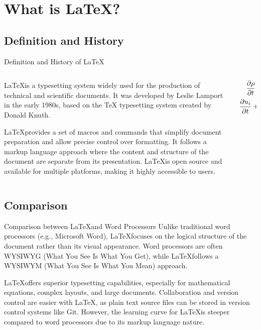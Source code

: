 \documentclass[aspectratio=169]{SUSTechBeamer}
\begin{document}
\section{What is \LaTeX?}

\subsection{Definition and History}
\begin{frame}{Definition and History of \LaTeX}
    \begin{columns}
        \begin{column}{0.6\textwidth}
  \LaTeX is a typesetting system widely used for the production of technical and scientific documents. It was developed by Leslie Lamport in the early 1980s, based on the TeX typesetting system created by Donald Knuth.

  \LaTeX provides a set of macros and commands that simplify document preparation and allow precise control over formatting. It follows a markup language approach where the content and structure of the document are separate from its presentation. \LaTeX is open source and available for multiple platforms, making it highly accessible to users.
        \end{column}
        \begin{column}{0.4\textwidth}
            \begin{align}
                \frac{\partial \rho}{\partial t}+\rho\frac{\partial u_i}{\partial x_i}&=0\\
                \frac{\partial u_i}{\partial t}+u_j\frac{\partial u_i}{\partial x_j}&=\frac{1}{\rho}\frac{\partial \sigma_{ij}}{\partial x_j}+f_i
            \end{align}
        \end{column}
    \end{columns}
\end{frame}

\subsection{Comparison}
\begin{frame}{Comparison between \LaTeX and Word Processors}
  Unlike traditional word processors (e.g., Microsoft Word), \LaTeX focuses on the logical structure of the document rather than its visual appearance. Word processors are often WYSIWYG (What You See Is What You Get), while \LaTeX follows a WYSIWYM (What You See Is What You Mean) approach.

  \LaTeX offers superior typesetting capabilities, especially for mathematical equations, complex layouts, and large documents. Collaboration and version control are easier with \LaTeX, as plain text source files can be stored in version control systems like Git. However, the learning curve for \LaTeX is steeper compared to word processors due to its markup language nature.
\end{frame}
\end{document}
